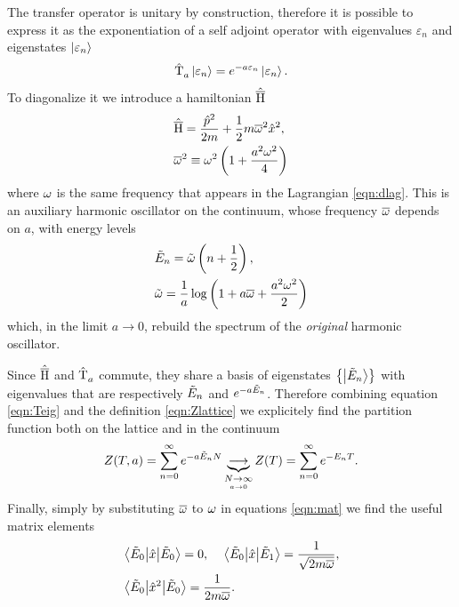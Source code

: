 The transfer operator is unitary by construction, therefore it is possible to express it as the exponentiation of a self adjoint operator with eigenvalues $\varepsilon_{n}$ and eigenstates
$\ket{\varepsilon_{n}}$
\begin{align}
  \label{eqn:Teig}
  \hat{\operatorname{T}}_a^{} \ket{\varepsilon_{n}} = e ^{-a\varepsilon_{n}}\ket{\varepsilon_{n}}.
\end{align}
To diagonalize it we introduce a hamiltonian $\hat{\operatorname{\overline{H}}}$
\begin{align}
  &\hat{\operatorname{\overline{H}}} = \frac{\hat{p} ^2}{2m}+\frac{1}{2}m\overline{\omega} ^2 \hat{x} ^2,\\
  &\overline{\omega} ^2 \equiv \omega ^2 \left(1 + \frac{a ^2 \omega ^2}{4}\right)
\end{align}
where $\omega$ is the same frequency that appears in the Lagrangian \ref{eqn:dlag}.
This is an auxiliary harmonic oscillator on the continuum, whose frequency $\overline{\omega}$ depends on $a$, with energy levels
\begin{align}
  &\tilde{E}_n = \tilde{\omega} \left(n + \frac{1}{2}\right), \\
  &\tilde{\omega}   = \frac{1}{a}\log \left(1 + a\overline{\omega} + \frac{a ^2\omega ^2}{2}\right) \label{eqn:expen}
\end{align}
which, in the limit $a\to 0$, rebuild the spectrum of the \textit{original} harmonic oscillator.

Since $\hat{\operatorname{\overline{H}}}$ and $\hat{\operatorname{T}}_a^{}$ commute, they share a basis of eigenstates $\qty{\ket{\tilde{E}_n}}$ with eigenvalues that are respectively $\tilde{E}_n$ and $e^{-a\tilde{E}_n}$. Therefore
combining equation \ref{eqn:Teig} and the definition \ref{eqn:Zlattice} we explicitely find the partition function both on the lattice and in the continuum
\begin{align}
  Z(T,a)= \sum_{n=0}^{\infty}e ^{-a\tilde{E}_nN} \underbrace{\longrightarrow}_{\underset{a\to 0}{N\to \infty}} Z(T) = \sum_{n=0}^{\infty}e ^{-E_{n}T}.
\end{align}
Finally, simply by substituting $\overline{\omega}$ to $\omega$ in equations \ref{eqn:mat} we find the useful matrix elements
\begin{align}
  &\ev{\hat{x}}{\Et{0}}=0,\quad
  \mel{\Et{0}}{\hat{x}}{\Et{1}} = \frac{1}{\sqrt{2m\wb}}, \notag\\
  &\ev{\hat{x}^2}{\Et{0}}= \frac{1}{2m\wb} \label{eqn:matbar}.
\end{align}
